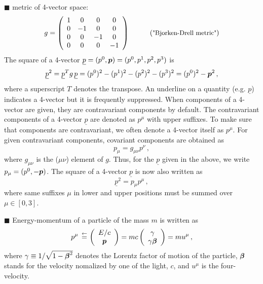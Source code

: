 $\blacksquare$
metric of 4-vector space:
\begin{equation*}
   g = 
 \left( \begin{array}{cccc}
       1 & 0&0&0\\
       0 & -1&0&0\\
       0 & 0&-1&0\\
       0 & 0&0&-1\\
              \end{array} \right)\hspace{10mm}({\mbox{\small "Bjorken-Drell metric"}})
\label{eqn:metric}
\end{equation*}
The square of a 4-vector $\underline{p} = (p^0, \mbox{\boldmath $p$}) = (p^0, p^1, p^2, p^3)$ is
\[ \underline{p}^2 = \underline{p}^T g\, \underline{p} = (p^0)^2 - (p^1)^2 - (p^2)^2 - (p^3)^2 = (p^0)^2 - \mbox{\boldmath $p$}^2\,, \]
where a superscript $T$ denotes the transpose. An underline on a quantity (e.g. $\underline{p}$) indicates a 
4-vector but it is frequently suppressed.
When components of a 4-vector are given, they are contravariant components by default.
The contravariant components of a 4-vector $\underline{p}$ are denoted as $p^{\mu}$ with
upper suffixes. To make sure that components are contravariant, we often denote a 4-vector
itself as $p^{\mu}$. For given contravariant components, covariant components are obtained
as
\[ p_{\mu} = g_{\mu \nu} p^\nu \,,\]
where $g_{\mu \nu}$ is the ($\mu \nu$) element of $g$.
Thus, for the $\underline{p}$ given in the above, we write $p_{\mu} = (p^0, -\mbox{\boldmath $p$})$.
The square of a 4-vector $\underline{p}$ is now also written as
\[ \underline{p}^2 = p_{\mu} p^{\mu} \,,\]
where same suffixes $\mu$ in lower and upper positions must be summed over $\mu \in [0,3]$.

\bigskip

\bigskip


\noindent
$\blacksquare$ Energy-momentum of a particle of the mass $m$ is written as
\begin{equation*}
	p^\mu \;\,\mbox{$\stackrel{\leftarrow}{=}$}\,
         \left( \begin{array}{c} E/ c \\ 
          \mbox{\boldmath $p$}  \end{array} \right)  
          =
	mc
         \left( \begin{array}{c} \gamma \\ 
          \gamma\mbox{\boldmath $\beta$}  \end{array} \right)  
          = m u^\mu \,,
\label{eqn:enmomvec}
\end{equation*}
where $\gamma \equiv 1 /\sqrt{1 - \mbox{\boldmath $\beta$}^2}$ denotes the Lorentz factor of motion of the particle,
$\mbox{\boldmath $\beta$}$ stands for the velocity nomalized by one of the light, $c$,
and $u^\mu$ is the four-velocity.

